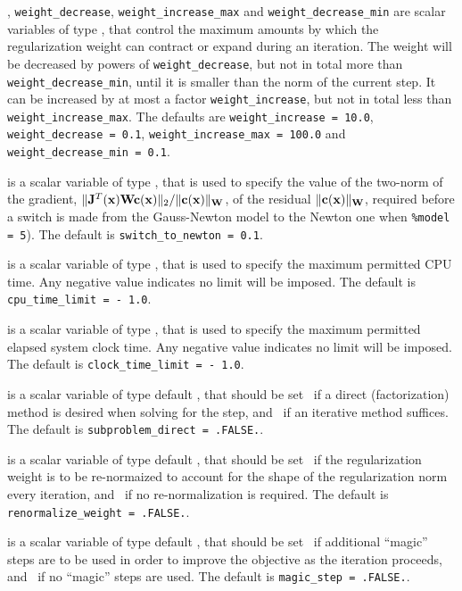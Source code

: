 \documentclass{galahad}
\begin{document}
\begin{description}
,
{\tt weight\_decrease},
{\tt weight\_increase\_max}
and
{\tt weight\_decrease\_min}
are scalar variables of type \realdp, that
control the maximum amounts by which the regularization weight can
contract or expand during an iteration. The weight will be decreased by
powers of {\tt weight\_decrease}, but not in total
more than  {\tt weight\_decrease\_min}, until it is smaller than the norm of
the current step.
It can be increased by at most a factor {\tt weight\_increase}, but not
in total less than {\tt weight\_increase\_max}.
The defaults are
{\tt weight\_increase = 10.0},
{\tt weight\_decrease = 0.1},
{\tt weight\_incr\-ease\_max = 100.0} and
{\tt weight\_decrease\_min = 0.1}.

 is a scalar variable of type \realdp,
that is used to specify the value of the two-norm of the gradient,
 $\|{\mathbf{J}}^T({\mathbf{x}}) {\mathbf{W}} {\mathbf{c}}({\mathbf{x}})\|_2/\|{\mathbf{c}}({\mathbf{x}})\|_{{\mathbf{W}}}$,
of the residual  $\|{\mathbf{c}}({\mathbf{x}})\|_{{\mathbf{W}}}$, required before a switch is made
from the Gauss-Newton model to the Newton one when {\tt \%model = 5}).
The default is
{\tt switch\_to\_newton = 0.1}.

 is a scalar variable of type \realdp,
that is used to specify the maximum permitted CPU time. Any negative
value indicates no limit will be imposed. The default is
{\tt cpu\_time\_limit = - 1.0}.

 is a scalar variable of type \realdp,
that is used to specify the maximum permitted elapsed system clock time.
Any negative value indicates no limit will be imposed. The default is
{\tt clock\_time\_limit = - 1.0}.

is a scalar variable of type default \logical,
that should be set \true\ if a direct (factorization) method is
desired when solving for the step, and \false\ if an iterative
method suffices.
The default is {\tt subproblem\_direct = .FALSE.}.

is a scalar variable of type default \logical,
that should be set \true\ if the regularization weight is to be
re-normaized to account for the shape of the regularization norm
every iteration, and \false\ if no re-normalization is required.
The default is {\tt renormalize\_weight = .FALSE.}.

is a scalar variable of type default \logical,
that should be set \true\ if additional ``magic'' steps are to be
used in order to improve the objective as the iteration proceeds,
and \false\ if no ``magic'' steps are used.
The default is {\tt magic\_step = .FALSE.}.


\end{description}
\end{document}
